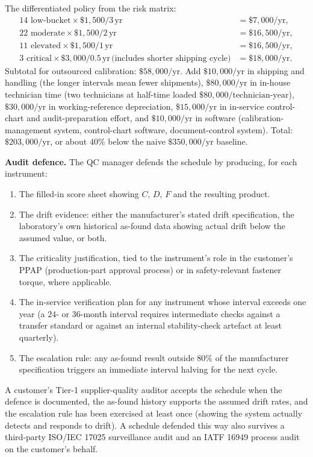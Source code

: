 The differentiated policy from the risk matrix:
\begin{align*}
14 \text{ low-bucket} \times \$1{,}500 / 3\,\text{yr}
    &= \$7{,}000/\text{yr}, \\
22 \text{ moderate} \times \$1{,}500 / 2\,\text{yr}
    &= \$16{,}500/\text{yr}, \\
11 \text{ elevated} \times \$1{,}500 / 1\,\text{yr}
    &= \$16{,}500/\text{yr}, \\
3 \text{ critical} \times \$3{,}000 / 0.5\,\text{yr}\,
    \text{(includes shorter shipping cycle)}
    &= \$18{,}000/\text{yr}.
\end{align*}
Subtotal for outsourced calibration: $\$58{,}000/\text{yr}$. Add
$\$10{,}000/\text{yr}$ in shipping and handling (the longer
intervals mean fewer shipments), $\$80{,}000/\text{yr}$ in
in-house technician time (two technicians at half-time loaded
$\$80{,}000/\text{technician-year}$), $\$30{,}000/\text{yr}$ in
working-reference depreciation, $\$15{,}000/\text{yr}$ in
in-service control-chart and audit-preparation effort, and
$\$10{,}000/\text{yr}$ in software (calibration-management
system, control-chart software, document-control system). Total:
$\$203{,}000/\text{yr}$, or about $40\%$ below the naive
$\$350{,}000/\text{yr}$ baseline.

\textbf{Audit defence.} The QC manager defends the schedule by
producing, for each instrument:
\begin{enumerate}[leftmargin=*]
  \item The filled-in score sheet showing $C$, $D$, $F$ and the
    resulting product.
  \item The drift evidence: either the manufacturer's stated
    drift specification, the laboratory's own historical as-found
    data showing actual drift below the assumed value, or both.
  \item The criticality justification, tied to the instrument's
    role in the customer's PPAP (production-part approval
    process) or in safety-relevant fastener torque, where
    applicable.
  \item The in-service verification plan for any instrument
    whose interval exceeds one year (a $24$- or $36$-month
    interval requires intermediate checks against a transfer
    standard or against an internal stability-check artefact at
    least quarterly).
  \item The escalation rule: any as-found result outside $80\%$
    of the manufacturer specification triggers an immediate
    interval halving for the next cycle.
\end{enumerate}
A customer's Tier-1 supplier-quality auditor accepts the
schedule when the defence is documented, the as-found history
supports the assumed drift rates, and the escalation rule has
been exercised at least once (showing the system actually
detects and responds to drift). A schedule defended this way
also survives a third-party ISO/IEC 17025 surveillance audit and
an IATF 16949 process audit on the customer's behalf.

